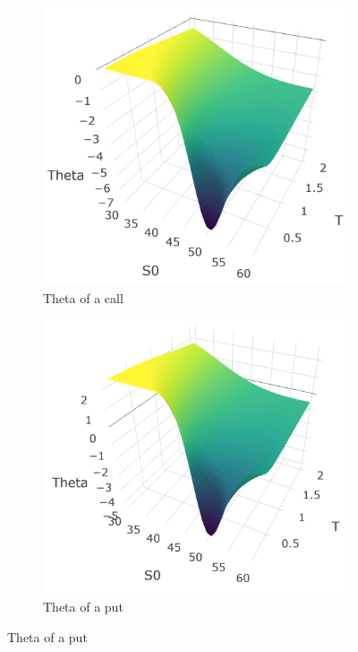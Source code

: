 \documentclass[hidelinks]{article}
\begin{document}
    \begin{figure}[!h]
	\centering
	\caption{Theta surfaces}
  \begin{subfigure}[b]{0.45\textwidth}
    \includegraphics[width=\textwidth]{theta_call.png}
    \caption{Theta of a call}
    \label{fig:theta_call}
  \end{subfigure}
  \begin{subfigure}[b]{0.45\textwidth}
    \includegraphics[width=\textwidth]{theta_put.png}
    \caption{Theta of a put}
    \label{fig:theta_put}
  \end{subfigure}
\end{figure}
\end{document}
